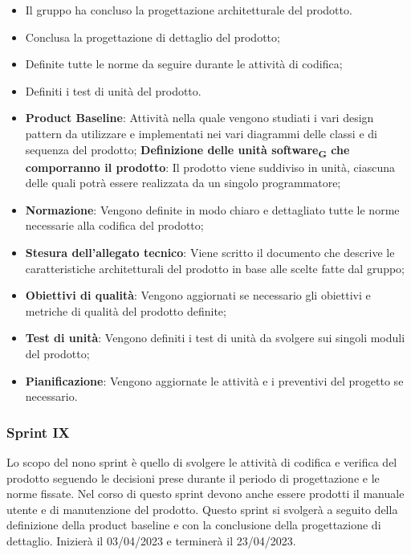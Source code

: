 \:
\begin{itemize}
	\item Il gruppo ha concluso la progettazione architetturale del prodotto.
\end{itemize}

\:
\begin{itemize}
	\item Conclusa la progettazione di dettaglio del prodotto;
	\item Definite tutte le norme da seguire durante le attività di codifica;
	\item Definiti i test di unità del prodotto.
\end{itemize}

\:
\begin{itemize}
	\item \textbf{Product Baseline}: Attività nella quale vengono studiati i vari design pattern da utilizzare e implementati nei vari diagrammi delle classi e di sequenza del prodotto;
	\subitem \textbf{Definizione delle unità software\textsubscript{G} che comporranno il prodotto}: Il prodotto viene suddiviso in unità, ciascuna delle quali potrà essere realizzata da un singolo programmatore;
	\item \textbf{Normazione}: Vengono definite in modo chiaro e dettagliato tutte le norme necessarie alla codifica del prodotto;
	\item \textbf{Stesura dell’allegato tecnico}: Viene scritto il documento che descrive le caratteristiche architetturali del prodotto in base alle scelte fatte dal gruppo;
	\item \textbf{Obiettivi di qualità}: Vengono aggiornati se necessario gli obiettivi e metriche di qualità del prodotto definite;
	\item \textbf{Test di unità}: Vengono definiti i test di unità da svolgere sui singoli moduli del prodotto;
	\item \textbf{Pianificazione}: Vengono aggiornate le attività e i preventivi del progetto se necessario.
\end{itemize}

\subsubsection{Sprint IX}
Lo scopo del nono sprint è quello di svolgere le attività di codifica e verifica del prodotto seguendo le decisioni prese durante il periodo di progettazione e le norme fissate. Nel corso di questo sprint devono anche essere prodotti il manuale utente e di manutenzione del prodotto.
Questo sprint si svolgerà a seguito della definizione della product baseline e con la conclusione della progettazione di dettaglio. Inizierà il 03/04/2023 e terminerà il 23/04/2023.

